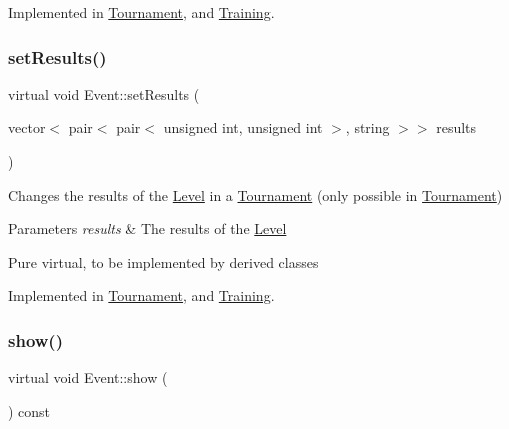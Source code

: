 Implemented in \hyperlink{class_tournament_a724f8fb0c0507975b6bb4817d8b5de7d}{Tournament}, and \hyperlink{class_training_a15d38322bd6a2ee8e17441bd4798b236}{Training}.

\hypertarget{class_event_a5ddb261642035be78677d668f9238339}{}\label{class_event_a5ddb261642035be78677d668f9238339} 
\subsubsection{\texorpdfstring{set\+Results()}{setResults()}}
{\footnotesize\ttfamily virtual void Event\+::set\+Results (\begin{DoxyParamCaption}\item[{vector$<$ pair$<$ pair$<$ unsigned int, unsigned int $>$, string $>$$>$}]{results }\end{DoxyParamCaption})\hspace{0.3cm}{\ttfamily [pure virtual]}}



Changes the results of the \hyperlink{class_level}{Level} in a \hyperlink{class_tournament}{Tournament} (only possible in \hyperlink{class_tournament}{Tournament}) 


\begin{DoxyParams}{Parameters}
{\em results} & The results of the \hyperlink{class_level}{Level}\\
\hline
\end{DoxyParams}
Pure virtual, to be implemented by derived classes 

Implemented in \hyperlink{class_tournament_acab9ee32169ba590f4ffdb5b59b28a86}{Tournament}, and \hyperlink{class_training_ad587b59c44a6e95a4e52f3d3f6b89480}{Training}.

\hypertarget{class_event_af53c2db83404a045087a271ed3c2604f}{}\label{class_event_af53c2db83404a045087a271ed3c2604f} 
\subsubsection{\texorpdfstring{show()}{show()}}
{\footnotesize\ttfamily virtual void Event\+::show (\begin{DoxyParamCaption}{ }\end{DoxyParamCaption}) const\hspace{0.3cm}{\ttfamily [pure virtual]}}



